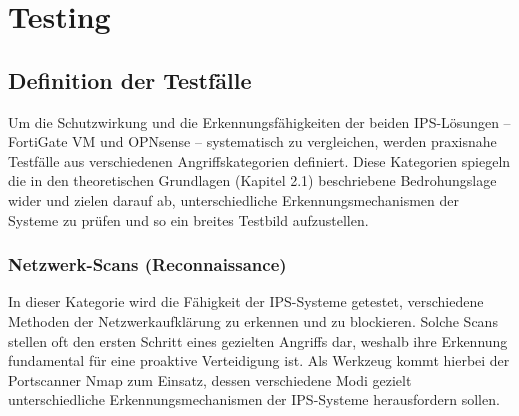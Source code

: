 \chapter{Testing}
\section{Definition der Testfälle}
Um die Schutzwirkung und die Erkennungsfähigkeiten der beiden IPS-Lösungen – FortiGate VM und OPNsense – systematisch zu vergleichen, werden praxisnahe Testfälle aus verschiedenen Angriffskategorien definiert. Diese Kategorien spiegeln die in den theoretischen Grundlagen (Kapitel 2.1) beschriebene Bedrohungslage wider und zielen darauf ab, unterschiedliche Erkennungsmechanismen der Systeme zu prüfen und so ein breites Testbild aufzustellen.

\subsection{Netzwerk-Scans (Reconnaissance)}

In dieser Kategorie wird die Fähigkeit der IPS-Systeme getestet, verschiedene Methoden der Netzwerkaufklärung zu erkennen und zu blockieren. Solche Scans stellen oft den ersten Schritt eines gezielten Angriffs dar, weshalb ihre Erkennung fundamental für eine proaktive Verteidigung ist. Als Werkzeug kommt hierbei der Portscanner Nmap zum Einsatz, dessen verschiedene Modi gezielt unterschiedliche Erkennungsmechanismen der IPS-Systeme herausfordern sollen.\\

